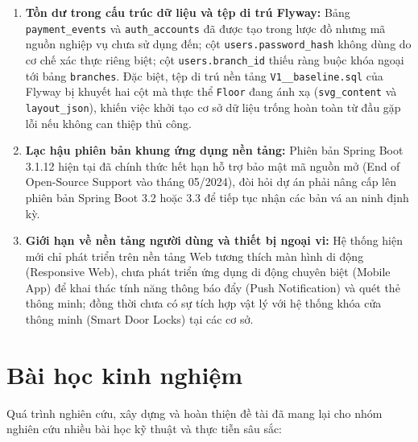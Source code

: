 \begin{enumerate}
    \item \textbf{Tồn dư trong cấu trúc dữ liệu và tệp di trú Flyway:} Bảng \texttt{payment\_events} và \texttt{auth\_accounts} đã được tạo trong lược đồ nhưng mã nguồn nghiệp vụ chưa sử dụng đến; cột \texttt{users.password\_hash} không dùng do cơ chế xác thực riêng biệt; cột \texttt{users.branch\_id} thiếu ràng buộc khóa ngoại tới bảng \texttt{branches}. Đặc biệt, tệp di trú nền tảng \texttt{V1\_\_baseline.sql} của Flyway bị khuyết hai cột mà thực thể \texttt{Floor} đang ánh xạ (\texttt{svg\_content} và \texttt{layout\_json}), khiến việc khởi tạo cơ sở dữ liệu trống hoàn toàn từ đầu gặp lỗi nếu không can thiệp thủ công.
    
    \item \textbf{Lạc hậu phiên bản khung ứng dụng nền tảng:} Phiên bản Spring Boot 3.1.12 hiện tại đã chính thức hết hạn hỗ trợ bảo mật mã nguồn mở (End of Open-Source Support vào tháng 05/2024), đòi hỏi dự án phải nâng cấp lên phiên bản Spring Boot 3.2 hoặc 3.3 để tiếp tục nhận các bản vá an ninh định kỳ.
    
    \item \textbf{Giới hạn về nền tảng người dùng và thiết bị ngoại vi:} Hệ thống hiện mới chỉ phát triển trên nền tảng Web tương thích màn hình di động (Responsive Web), chưa phát triển ứng dụng di động chuyên biệt (Mobile App) để khai thác tính năng thông báo đẩy (Push Notification) và quét thẻ thông minh; đồng thời chưa có sự tích hợp vật lý với hệ thống khóa cửa thông minh (Smart Door Locks) tại các cơ sở.
\end{enumerate}

\section{Bài học kinh nghiệm}
\label{sec:kl_baihoc}

Quá trình nghiên cứu, xây dựng và hoàn thiện đề tài đã mang lại cho nhóm nghiên cứu nhiều bài học kỹ thuật và thực tiễn sâu sắc:


